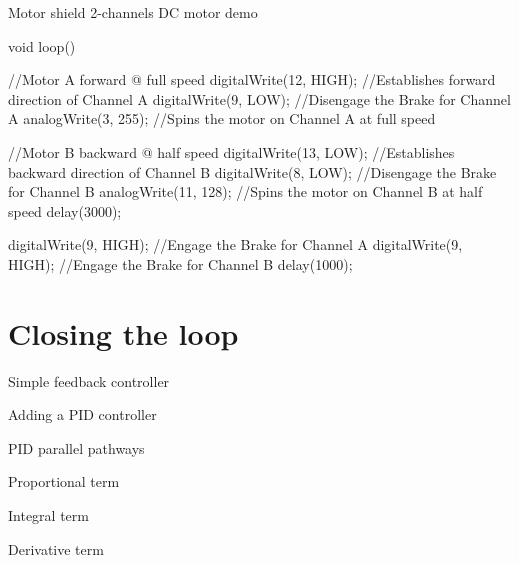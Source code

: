 \documentclass[compress]{beamer}
\begin{document}
\begin{frame}[fragile]{Motor shield 2-channels DC motor demo}

\begin{cppcode}
void loop(){
  //Motor A forward @ full speed
  digitalWrite(12, HIGH); //Establishes forward direction of Channel A
  digitalWrite(9, LOW); //Disengage the Brake for Channel A
  analogWrite(3, 255); //Spins the motor on Channel A at full speed

  //Motor B backward @ half speed
  digitalWrite(13, LOW); //Establishes backward direction of Channel B
  digitalWrite(8, LOW); //Disengage the Brake for Channel B
  analogWrite(11, 128); //Spins the motor on Channel B at half speed
  delay(3000);

  digitalWrite(9, HIGH); //Engage the Brake for Channel A
  digitalWrite(9, HIGH); //Engage the Brake for Channel B
  delay(1000);
}
\end{cppcode}

\end{frame}

\section{Closing the loop}


{
    \begin{frame}{Simple feedback controller}
    \end{frame}
}

{
    \begin{frame}{Adding a PID controller}
    \end{frame}
}

{
    \begin{frame}{PID parallel pathways}
    \end{frame}
}

{
    \begin{frame}{Proportional term}
    \end{frame}
}

{
    \begin{frame}{Integral term}
    \end{frame}
}

{
    \begin{frame}{Derivative term}
    \end{frame}
}
\end{document}
